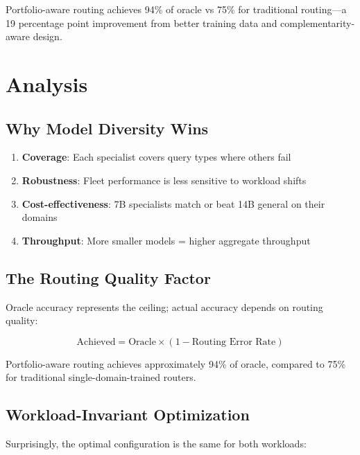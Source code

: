 \documentclass[11pt,a4paper]{article}
\begin{document}
Portfolio-aware routing achieves 94\% of oracle vs 75\% for traditional routing---a 19 percentage point improvement from better training data and complementarity-aware design.

\section{Analysis}

\subsection{Why Model Diversity Wins}

\begin{enumerate}
    \item \textbf{Coverage}: Each specialist covers query types where others fail
    \item \textbf{Robustness}: Fleet performance is less sensitive to workload shifts
    \item \textbf{Cost-effectiveness}: 7B specialists match or beat 14B general on their domains
    \item \textbf{Throughput}: More smaller models = higher aggregate throughput
\end{enumerate}

\subsection{The Routing Quality Factor}

Oracle accuracy represents the ceiling; actual accuracy depends on routing quality:

\begin{equation}
    \text{Achieved} = \text{Oracle} \times (1 - \text{Routing Error Rate})
\end{equation}

Portfolio-aware routing achieves approximately 94\% of oracle, compared to 75\% for traditional single-domain-trained routers.

\subsection{Workload-Invariant Optimization}

Surprisingly, the optimal configuration is the same for both workloads:

\begin{center}
\end{center}
\end{document}
